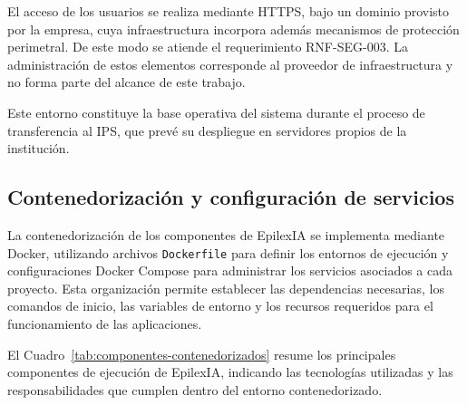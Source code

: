 El acceso de los usuarios se realiza mediante HTTPS, bajo un dominio provisto por la empresa, cuya infraestructura incorpora además mecanismos de protección perimetral.
De este modo se atiende el requerimiento RNF-SEG-003.
La administración de estos elementos corresponde al proveedor de infraestructura y no forma parte del alcance de este trabajo.

Este entorno constituye la base operativa del sistema durante el proceso de transferencia al IPS, que prevé su despliegue en servidores propios de la institución.

\subsection{Contenedorización y configuración de servicios}

La contenedorización de los componentes de EpilexIA se implementa
mediante Docker, utilizando archivos \texttt{Dockerfile} para definir los
entornos de ejecución y configuraciones Docker Compose para
administrar los servicios asociados a cada proyecto. Esta
organización permite establecer las dependencias necesarias,
los comandos de inicio, las variables de entorno y los recursos
requeridos para el funcionamiento de las aplicaciones.

El Cuadro~\ref{tab:componentes-contenedorizados} resume los
principales componentes de ejecución de EpilexIA, indicando
las tecnologías utilizadas y las responsabilidades que
cumplen dentro del entorno contenedorizado.


